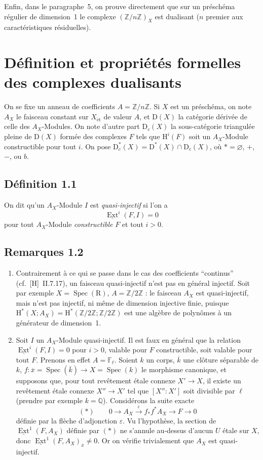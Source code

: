 \documentclass[11pt]{article}
\renewcommand{\H}{\mathrm{H}}
\DeclareMathOperator{\Ext}{Ext}
\DeclareMathOperator{\Spec}{Spec}
\newcommand{\R}{\mathrm{R}}
\newcommand{\D}{\mathrm{D}}
\newcommand{\Z}{\mathbb{Z}}
\newcommand{\F}{\mathbb{F}}
\newcommand{\Q}{\mathbb{Q}}
\newcommand{\ol}[1]{\overline{#1}}
\providecommand{\R}{\mathrm R}
\providecommand{\Z}{\mathbb Z}
\providecommand{\Spec}{\operatorname{Spec}}
\providecommand{\Spec}{\operatorname{Spec}}
\providecommand{\Spec}{\operatorname{Spec}}
\providecommand{\Spec}{\operatorname{Spec}}
\begin{document}
Enfin, dans le paragraphe~5, on prouve directement que sur un préschéma régulier de dimension~1 le complexe $(\Z/n\Z)_X$ est dualisant ($n$ premier aux caractéristiques résiduelles).

\section{Définition et propriétés formelles des complexes dualisants}

On se fixe un anneau de coefficients $A = \Z/n\Z$. Si $X$ est un préschéma, on note $A_X$ le faisceau constant sur $X_{\mathrm{\acute{e}t}}$ de valeur $A$, et $\D(X)$ la catégorie dérivée de celle des $A_X$-Modules. On note d'autre part $\D_c(X)$ la sous-catégorie triangulée pleine de $\D(X)$ formée des complexes $F$ tels que $\H^i(F)$ soit un $A_X$-Module constructible pour tout $i$. On pose $\D_c^{*}(X) = \D^{*}(X) \cap \D_c(X)$, où $* = \varnothing$, $+$, $-$, ou $b$.

\subsection*{Définition 1.1}
On dit qu'un $A_X$-Module $I$ est \emph{quasi-injectif} si l'on a
\[
\underline{\Ext}^i(F,I) = 0
\]
pour tout $A_X$-Module \emph{constructible} $F$ et tout $i > 0$.

\subsection*{Remarques 1.2}
\begin{enumerate}[label=\alph*)]
\item Contrairement à ce qui se passe dans le cas des coefficients ``continus'' (cf.~[H]~II.7.17), un faisceau quasi-injectif n'est pas en général injectif. Soit par exemple $X = \Spec(\R)$, $A = \Z/2\Z$ : le faisceau $A_X$ est quasi-injectif, mais n'est pas injectif, ni même de dimension injective finie, puisque $\H^{*}(X; A_X) = \H^{*}(\Z/2\Z; \Z/2\Z)$ est une algèbre de polynômes à un générateur de dimension~1.

\item Soit $I$ un $A_X$-Module quasi-injectif. Il est faux en général que la relation $\underline{\Ext}^i(F,I) = 0$ pour $i > 0$, valable pour $F$ constructible, soit valable pour tout $F$. Prenons en effet $A = \F_{\ell}$. Soient $k$ un corps, $\ol{k}$ une clôture séparable de $k$, $f : \ol{x} = \Spec(\ol{k}) \to X = \Spec(k)$ le morphisme canonique, et supposons que, pour tout revêtement étale connexe $X' \to X$, il existe un revêtement étale connexe $X'' \to X'$ tel que $[X'':X']$ soit divisible par $\ell$ (prendre par exemple $k = \Q$). Considérons la suite exacte
\[
(*) \qquad 0 \longrightarrow A_X \xrightarrow{\;\varepsilon\;} f_{*}f^{*}A_X \longrightarrow F \longrightarrow 0
\]
définie par la flèche d'adjonction $\varepsilon$. Vu l'hypothèse, la section de $\underline{\Ext}^1(F,A_X)$ définie par $(*)$ ne s'annule au-dessus d'aucun $U$ étale sur $X$, donc $\underline{\Ext}^1(F,A_X)_{\ol{x}} \neq 0$. Or on vérifie trivialement que $A_X$ est quasi-injectif.
\end{enumerate}
\end{document}
